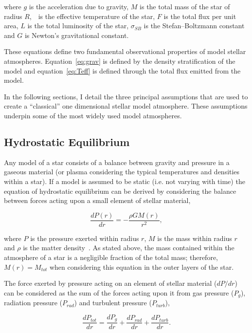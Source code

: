 where $g$ is the acceleration due to gravity, $M$ is the total mass of the star of radius $R$,~\Teff~is the effective temperature of the star, $F$ is the total flux per unit area, $L$ is the total luminosity of the star, $\sigma_{SB}$ is the Stefan--Boltzmann constant and $G$ is Newton's gravitational constant.

These equations define two fundamental observational properties of model stellar atmospheres.
Equation~\ref{eq:grav} is defined by the density stratification of the model and equation~\ref{eq:Teff} is defined through the total flux emitted from the model.

In the following sections, I detail the three principal assumptions that are used to create a ``classical'' one dimensional stellar model atmosphere.
These assumptions underpin some of the most widely used model atmospheres.


\subsection{Hydrostatic Equilibrium} %
\label{sub:hydrostatic_equilibrium}

Any model of a star consists of a balance between gravity and pressure in a gaseous material (or plasma considering the typical temperatures and densities within a star).
If a model is assumed to be static (i.e. not varying with time) the equation of hydrostatic equilibrium can be derived by considering the balance between forces acting upon a small element of stellar material,

\begin{equation}
    \frac{dP(r)}{dr} = -\frac{\rho GM(r)}{r^2},\label{eq:hydro}
\end{equation}

where $P$ is the pressure exerted within radius $r$, $M$ is the mass within radius $r$ and $\rho$ is the matter density~\citep[see Chapter 9 of ][for a simple derivation of this equation]{1989isa2.book.....B}.
As stated above, the mass contained within the atmosphere of a star is a negligible fraction of the total mass; therefore, $M(r) = M_{tot}$ when considering this equation in the outer layers of the star.

The force exerted by pressure acting on an element of stellar material ($dP/dr$) can be considered as the sum of the forces acting upon it from gas pressure ($P_{g}$), radiation pressure ($P_{rad}$) and turbulent pressure ($P_{turb}$),

\begin{equation}
    \frac{dP_{tot}}{dr} = \frac{dP_{g}}{dr} + \frac{dP_{rad}}{dr} + \frac{dP_{turb}}{dr}.\label{eq:pressure}
\end{equation}

